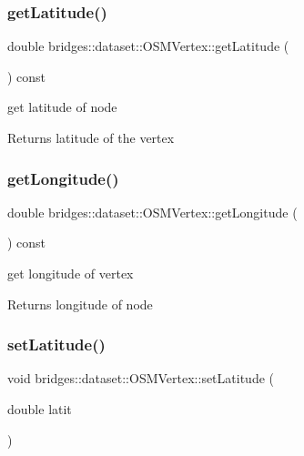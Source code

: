 \subsubsection{\texorpdfstring{get\+Latitude()}{getLatitude()}}
{\footnotesize\ttfamily double bridges\+::dataset\+::\+O\+S\+M\+Vertex\+::get\+Latitude (\begin{DoxyParamCaption}{ }\end{DoxyParamCaption}) const\hspace{0.3cm}{\ttfamily [inline]}}

get latitude of node

\begin{DoxyReturn}{Returns}
latitude of the vertex 
\end{DoxyReturn}
\mbox{\label{classbridges_1_1dataset_1_1_o_s_m_vertex_a98e17875d886a63ed73a6f77cc26686d}} 
\subsubsection{\texorpdfstring{get\+Longitude()}{getLongitude()}}
{\footnotesize\ttfamily double bridges\+::dataset\+::\+O\+S\+M\+Vertex\+::get\+Longitude (\begin{DoxyParamCaption}{ }\end{DoxyParamCaption}) const\hspace{0.3cm}{\ttfamily [inline]}}

get longitude of vertex

\begin{DoxyReturn}{Returns}
longitude of node 
\end{DoxyReturn}
\mbox{\label{classbridges_1_1dataset_1_1_o_s_m_vertex_af4ab2d69122919f504b78bd9540ccaa1}} 
\subsubsection{\texorpdfstring{set\+Latitude()}{setLatitude()}}
{\footnotesize\ttfamily void bridges\+::dataset\+::\+O\+S\+M\+Vertex\+::set\+Latitude (\begin{DoxyParamCaption}\item[{double}]{latit }\end{DoxyParamCaption})\hspace{0.3cm}{\ttfamily [inline]}}

